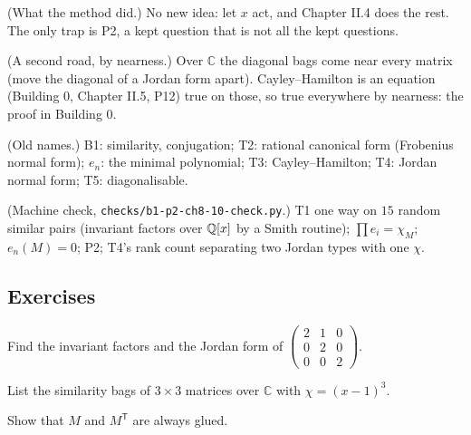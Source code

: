 \begin{lines}
\item[\lab{R1}] (What the method did.) No new idea: let $x$ act, and Chapter II.4 does the rest. The only trap is P2, a kept question that is not all the kept questions.
\item[\lab{R2}] (A second road, by nearness.) Over $\mathbb{C}$ the diagonal bags come near every matrix (move the diagonal of a Jordan form apart). Cayley--Hamilton is an equation (Building 0, Chapter II.5, P12) true on those, so true everywhere by nearness: the proof in Building 0.
\item[\lab{R3}] (Old names.) B1: similarity, conjugation; T2: rational canonical form (Frobenius normal form); $e_n$: the minimal polynomial; T3: Cayley--Hamilton; T4: Jordan normal form; T5: diagonalisable.
\item[\lab{R4}] (Machine check, \texttt{checks/b1-p2-ch8-10-check.py}.) T1 one way on $15$ random similar pairs (invariant factors over $\mathbb{Q}[x]$ by a Smith routine); $\prod e_i = \chi_M$; $e_n(M) = 0$; P2; T4's rank count separating two Jordan types with one $\chi$.
\end{lines}

\subsection*{Exercises}

\begin{lines}
\item[\lab{E1}] Find the invariant factors and the Jordan form of $\begin{pmatrix} 2 & 1 & 0 \\ 0 & 2 & 0 \\ 0 & 0 & 2 \end{pmatrix}$.
\item[\lab{E2}] List the similarity bags of $3 \times 3$ matrices over $\mathbb{C}$ with $\chi = (x - 1)^3$.
\item[\lab{E3}] Show that $M$ and $M^{\mathsf T}$ are always glued.
\end{lines}

\newpage

